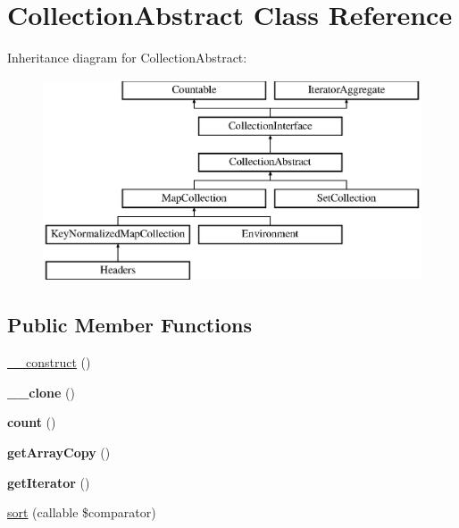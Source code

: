 \hypertarget{class_pes_1_1_collection_1_1_collection_abstract}{}\section{Collection\+Abstract Class Reference}
\label{class_pes_1_1_collection_1_1_collection_abstract}
Inheritance diagram for Collection\+Abstract\+:\begin{figure}[H]
\begin{center}
\leavevmode
\includegraphics[height=6.000000cm]{class_pes_1_1_collection_1_1_collection_abstract}
\end{center}
\end{figure}
\subsection*{Public Member Functions}
\begin{DoxyCompactItemize}
\item 
\mbox{\hyperlink{class_pes_1_1_collection_1_1_collection_abstract_a095c5d389db211932136b53f25f39685}{\+\_\+\+\_\+construct}} ()
\item 
\mbox{\label{class_pes_1_1_collection_1_1_collection_abstract_ad0cb87b388bc74d63dc884accdca8713}} 
{\bfseries \+\_\+\+\_\+clone} ()
\item 
\mbox{\label{class_pes_1_1_collection_1_1_collection_abstract_ac751e87b3d4c4bf2feb03bee8b092755}} 
{\bfseries count} ()
\item 
\mbox{\label{class_pes_1_1_collection_1_1_collection_abstract_a9c9bae4e44ee76a926fa7ecdc49dd8b5}} 
{\bfseries get\+Array\+Copy} ()
\item 
\mbox{\label{class_pes_1_1_collection_1_1_collection_abstract_a7a9f937c2958e6f4dd7b030f86fb70b7}} 
{\bfseries get\+Iterator} ()
\item 
\mbox{\hyperlink{class_pes_1_1_collection_1_1_collection_abstract_ac3d1855cff23b99e728759a333684eb2}{sort}} (callable \$comparator)
\end{DoxyCompactItemize}
